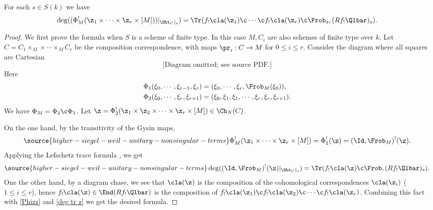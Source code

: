 \begin{prop}
\notready\label{p:Lef} For each $s\in S(k)$ we have
\begin{equation*}
\deg((\Phi_{M}^{!}(\z_{1}\times\cdots\times\z_{r} \times [M] ))|_{\Sht_{C}|_s})=\Tr(f_{!}\cla(\z_{1})\c\cdots\c f_{!}\cla(\z_{r})\c\Frob_{s}, (Rf_{!}\Qlbar)_{s}).
\end{equation*}
\end{prop}
\begin{proof} We first prove the formula when $S$ is a scheme of finite type.  In this case $M,C_{i}$ are also schemes of finite type over $k$. Let $C=C_{1}\times_{M}\times\cdots\times_{M}C_{r}$ be the composition correspondence, with maps $\pr_{i}: C\to M$ for $0\le i\le r$.  Consider the diagram where all squares are Cartesian
\begin{equation}
\text{[Diagram omitted; see source PDF.]}
\end{equation}
Here
\begin{align*}
\Phi_{1}(\xi_{0},\cdots,  \xi_{r-1}, \xi_r) & =(\xi_{0},\cdots, \xi_r, \Frob_{M}(\xi_{0})),\\
\Phi_{2}(\xi_{0},\cdots, \xi_r,\xi_{r+1}) & =(\xi_{0},\xi_{1},\xi_{1},\cdots,\xi_{r},\xi_{r}, \xi_{r+1}).
\end{align*}
We have $\Phi_{M}=\Phi_{2}\c\Phi_{1}$. Let $\z=\Phi_{2}^{!}(\z_{1}\times\z_{2}\times\cdots\times\z_{r} \times [M])\in \Ch_{N}(C)$.

On the one hand, by the transitivity of the Gysin maps,
\begin{equation}\label{Phizz}
\source{higher-siegel-weil-unitary-nonsingular-terms}
\Phi^{!}_{M}(\z_{1}\times\cdots\times\z_{r} \times [M] )=\Phi_{1}^{!}(\z)=(\Id,\Frob_{M})^{!}(\z).
\end{equation}
Applying the Lefschetz trace formula \cite[Proposition  A.12]{YZ}, we get
\begin{equation}\label{deg tr z}
\source{higher-siegel-weil-unitary-nonsingular-terms}
\deg((\Id,\Frob_{M})^{!}(\z)|_{\Sht_{C}|_s})=\Tr(f_{!}\cla(\z)\c \Frob, (Rf_{!}\Qlbar)_{s}).
\end{equation}
One the other hand, by a diagram chase, we see that $\cla(\z)$ is the composition of the cohomological correspondences $\cla(\z_{i})$ ($1\le i\le r$), hence $f_{!}\cla(\z)\in \End(Rf_{!}\Qlbar)$ is the composition of $f_{!}\cla(\z_{1})\c f_{!}\cla(\z_{2})\c\cdots\c f_{!}\cla(\z_{r})$. Combining this fact with \eqref{Phizz} and \eqref{deg tr z} we get the desired formula.


\end{proof}
